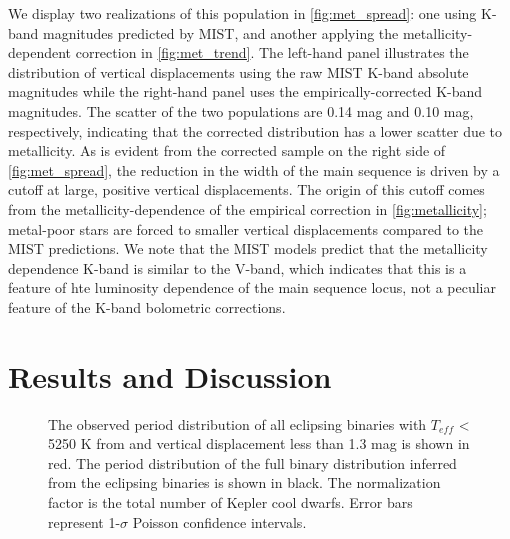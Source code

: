 \documentclass[manuscript]{aastex6}
\newcommand{\Teff}{\ensuremath{T_{eff}}}
\begin{document}
We display two realizations of this population in \cref{fig:met_spread}: one
using K-band magnitudes predicted by MIST, and another applying the
metallicity-dependent correction in \cref{fig:met_trend}.
The left-hand panel illustrates the distribution of vertical displacements 
using the raw MIST K-band absolute magnitudes while the right-hand panel
uses the empirically-corrected K-band magnitudes. The scatter of the two
populations are 0.14 mag and 0.10 mag, respectively, indicating that the
corrected distribution has a lower scatter due to metallicity.
As is evident from the corrected sample on the right side of 
\cref{fig:met_spread}, the reduction in the width of the main 
sequence is driven by a cutoff at large, positive vertical displacements.
The origin of this cutoff comes from the metallicity-dependence of the empirical 
correction in \cref{fig:metallicity}; metal-poor stars are forced to smaller 
vertical displacements compared to the MIST predictions. We note that the MIST 
models predict that the metallicity dependence K-band is similar to the V-band,
which indicates that this is a feature of hte luminosity dependence of the main
sequence locus, not a peculiar feature of the K-band bolometric corrections.

\section{Results and Discussion}
\label{sec:results}

\begin{figure}[htb]
    \centering
    \caption{The observed period distribution of all eclipsing binaries with
    \Teff{} < 5250 K from \citet{Pinsonneault12} and vertical displacement less
than 1.3 mag is shown in red. The period distribution of the full binary
distribution inferred from the eclipsing binaries is shown in black. The
normalization factor is the total number of Kepler cool dwarfs. Error bars
represent 1-\(\sigma\) Poisson confidence intervals.}\label{fig:ebdist}
\end{figure}
\end{document}
